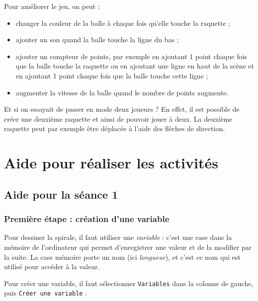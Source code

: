Pour améliorer le jeu, on peut :

\begin{itemize}
	\item changer la couleur de la balle à chaque fois qu'elle touche la raquette ;
	\item ajouter un son quand la balle touche la ligne du bas ;
	\item ajouter un compteur de points, par exemple en ajoutant 1 point chaque fois que la balle touche la raquette ou en ajoutant une ligne en haut de la scène et en ajoutant 1 point chaque fois que la balle touche cette ligne ;
	\item augmenter la vitesse de la balle quand le nombre de points augmente.
\end{itemize}

\vspace{1em}

Et si on essayait de passer en mode deux joueurs ? En effet, il est possible de créer une deuxième raquette et ainsi de pouvoir jouer à deux. La deuxième raquette peut par exemple être déplacée à l'aide des flèches de direction.


\newpage



\section{Aide pour réaliser les activités}\label{aide_seanceScratch1}

\subsection{Aide pour la séance 1}

\subsubsection{Première étape : création d'une variable}\label{Scratch5eCreationVariable} 
  

Pour dessiner la spirale, il faut utiliser une \emph{variable} : c'est une case dans la mémoire de l'ordinateur qui permet d'enregistrer une valeur et de la modifier par la suite. La case mémoire porte un nom (ici \emph{longueur}), et c'est ce nom qui est utilisé pour accéder à la valeur.

Pour créer une variable, il faut sélectionner \texttt{Variables} dans la colonne de gauche, puis \texttt{Créer une variable} :

